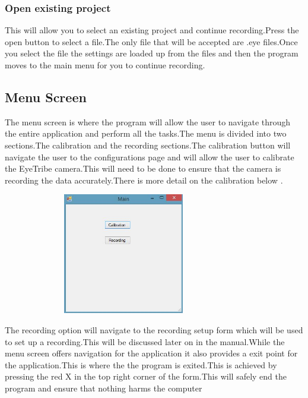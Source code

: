 \subsubsection{Open existing project} 
This will allow you to select an existing project and continue recording.Press the open button to select a file.The only file that will be accepted are .eye files.Once you select the file the settings are loaded up from the files and then the program moves to the main menu for you to continue recording.

\subsection{Menu Screen}
The menu screen is where the program will allow the user to navigate through the entire application and perform all the tasks.The menu is divided into two sections.The calibration and the recording sections.The calibration button will navigate the user to the configurations page and will allow the user to calibrate the EyeTribe camera.This will need to be done to ensure that the camera is recording the data accurately.There is more detail on the calibration below .

\includegraphics[width=400px,height=200px]{./Images/Mainpage.JPG}

The recording option will navigate to the recording setup form which will be used to set up a recording.This will be discussed later on in the manual.While the menu screen offers navigation for the application it also provides a exit point for the application.This is where the the program is exited.This is achieved by pressing the red X in the top right corner of the form.This will safely end the program and ensure that nothing harms the computer

